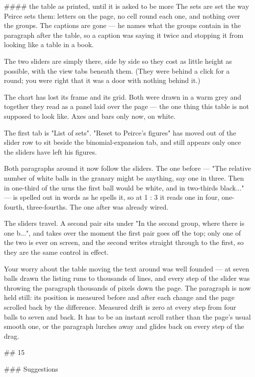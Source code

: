 #### the table as printed, until it is asked to be more
The sets are set the way Peirce sets them: letters on the page, no cell round
each one, and nothing over the groups. The captions are gone — he names what the
groups contain in the paragraph after the table, so a caption was saying it
twice and stopping it from looking like a table in a book.

The two sliders are simply there, side by side so they cost as little height as
possible, with the view tabs beneath them. (They were behind a click for a
round; you were right that it was a door with nothing behind it.)

The chart has lost its frame and its grid. Both were drawn in a warm grey and
together they read as a panel laid over the page — the one thing this table is
not supposed to look like. Axes and bars only now, on white.

The first tab is "List of sets". "Reset to Peirce's figures" has moved out of the
slider row to sit beside the binomial-expansion tab, and still appears only once
the sliders have left his figures.

Both paragraphs around it now follow the sliders. The one before — "The relative
number of white balls in the granary might be anything, say one in three. Then
in one-third of the urns the first ball would be white, and in two-thirds
black..." — is spelled out in words as he spells it, so at 1 : 3 it reads one in
four, one-fourth, three-fourths. The one after was already wired.

The sliders travel. A second pair sits under "In the second group, where there is
one b...", and takes over the moment the first pair goes off the top; only one of
the two is ever on screen, and the second writes straight through to the first,
so they are the same control in effect.

Your worry about the table moving the text around was well founded — at seven
balls drawn the listing runs to thousands of lines, and every step of the slider
was throwing the paragraph thousands of pixels down the page. The paragraph is
now held still: its position is measured before and after each change and the
page scrolled back by the difference. Measured drift is zero at every step from
four balls to seven and back. It has to be an instant scroll rather than the
page's usual smooth one, or the paragraph lurches away and glides back on every
step of the drag.


## 15

### Suggestions

